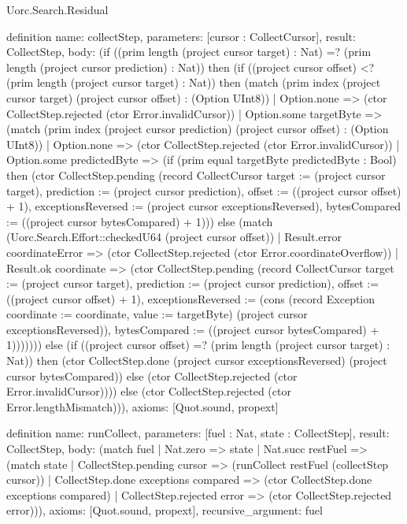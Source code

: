 \begin{lexlean}{Uorc.Search.Residual}
\begin{semanticmodule}
definition{
  name: collectStep,
  parameters: [cursor : CollectCursor],
  result: CollectStep,
  body: (if ((prim length (project cursor target) : Nat) =? (prim length (project cursor prediction) : Nat)) then (if ((project cursor offset) <? (prim length (project cursor target) : Nat)) then (match (prim index (project cursor target) (project cursor offset) : (Option UInt8))
    | Option.none => (ctor CollectStep.rejected (ctor Error.invalidCursor))
    | Option.some targetByte => (match (prim index (project cursor prediction) (project cursor offset) : (Option UInt8))
      | Option.none => (ctor CollectStep.rejected (ctor Error.invalidCursor))
      | Option.some predictedByte => (if (prim equal targetByte predictedByte : Bool) then (ctor CollectStep.pending (record CollectCursor {target := (project cursor target), prediction := (project cursor prediction), offset := ((project cursor offset) + 1), exceptionsReversed := (project cursor exceptionsReversed), bytesCompared := ((project cursor bytesCompared) + 1)})) else (match (Uorc.Search.Effort::checkedU64 (project cursor offset))
        | Result.error coordinateError => (ctor CollectStep.rejected (ctor Error.coordinateOverflow))
        | Result.ok coordinate => (ctor CollectStep.pending (record CollectCursor {target := (project cursor target), prediction := (project cursor prediction), offset := ((project cursor offset) + 1), exceptionsReversed := (cons (record Exception {coordinate := coordinate, value := targetByte}) (project cursor exceptionsReversed)), bytesCompared := ((project cursor bytesCompared) + 1)})))))) else (if ((project cursor offset) =? (prim length (project cursor target) : Nat)) then (ctor CollectStep.done (project cursor exceptionsReversed) (project cursor bytesCompared)) else (ctor CollectStep.rejected (ctor Error.invalidCursor)))) else (ctor CollectStep.rejected (ctor Error.lengthMismatch))),
  axioms: [Quot.sound, propext]
}

definition{
  name: runCollect,
  parameters: [fuel : Nat, state : CollectStep],
  result: CollectStep,
  body: (match fuel
    | Nat.zero => state
    | Nat.succ restFuel => (match state
      | CollectStep.pending cursor => (runCollect restFuel (collectStep cursor))
      | CollectStep.done exceptions compared => (ctor CollectStep.done exceptions compared)
      | CollectStep.rejected error => (ctor CollectStep.rejected error))),
  axioms: [Quot.sound, propext],
  recursive_argument: fuel
}


\end{semanticmodule}
\end{lexlean}
